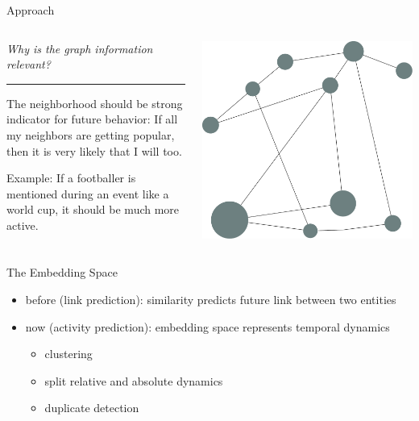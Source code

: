 \documentclass[
  8pt,
  ignorenonframetext,
  aspectratio=43,
]{beamer}
\providecommand{\tightlist}{%
  \setlength{\itemsep}{0pt}\setlength{\parskip}{0pt}}
\begin{document}
\begin{frame}{Approach}
\protect\hypertarget{approach-1}{}
\begin{columns}[T]
\begin{column}{0.48\textwidth}
\emph{Why is the graph information relevant?}

\begin{center}\rule{0.5\linewidth}{0.5pt}\end{center}

The neighborhood should be strong indicator for future behavior: If all
my neighbors are getting popular, then it is very likely that I will
too.

Example: If a footballer is mentioned during an event like a world cup,
it should be much more active.
\end{column}

\begin{column}{0.48\textwidth}
\includegraphics{graph_temp.pdf}
\end{column}
\end{columns}
\end{frame}

\begin{frame}{The Embedding Space}
\protect\hypertarget{the-embedding-space}{}
\begin{itemize}
\tightlist
\item
  before (link prediction): similarity predicts future link between two
  entities
\item
  now (activity prediction): embedding space represents temporal
  dynamics

  \begin{itemize}
  \tightlist
  \item
    clustering
  \item
    split relative and absolute dynamics
  \item
    duplicate detection
  \end{itemize}
\end{itemize}
\end{frame}
\end{document}
